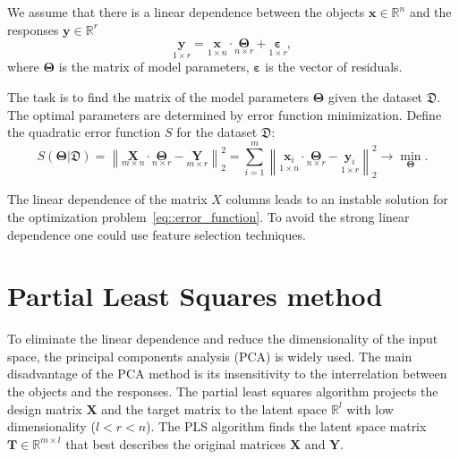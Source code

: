\documentclass[12pt,twoside]{article}
\begin{document}
We assume that there is a linear dependence between the objects $\mathbf{x} \in \mathbb{R}^n$ and the responses $\mathbf{y} \in \mathbb{R}^r$
\begin{equation}
 \underset{1 \times r}{\mathbf{y}} = \underset{1 \times n}{\mathbf{x}} \cdot \underset{n \times r}{\boldsymbol{\Theta}} + \underset{1 \times r}{\boldsymbol{\varepsilon}}, 
\label{eq::model}
\end{equation}
where $\boldsymbol{\Theta}$ is the matrix of model parameters, $\boldsymbol{\varepsilon}$ is the vector of residuals.

The task is to find the matrix of the model parameters $\boldsymbol{\Theta}$ given the dataset $\mathfrak{D}$.
The optimal parameters are determined by error function minimization. 
Define the quadratic error function $S$ for the dataset $\mathfrak{D}$:
\begin{equation}
	S(\boldsymbol{\Theta} | \mathfrak{D}) = {\left\| \underset{m \times n}{\mathbf{X}} \cdot \underset{n \times r}{\boldsymbol{\Theta}} - \underset{m \times r}{\mathbf{Y}} \right\| }_2^2 = \sum_{i=1}^m \left\| \underset{1 \times n}{\mathbf{x}_i} \cdot \underset{n \times r}{\boldsymbol{\Theta}} - \underset{1 \times r}{\mathbf{y}_i} \right\|_2^2 \rightarrow\min_{\boldsymbol{\Theta}}.
\label{eq::error_function}
\end{equation}
 
 The linear dependence of the matrix $X$ columns leads to an instable solution for the optimization problem~\eqref{eq::error_function}. 
 To avoid the strong linear dependence one could use feature selection techniques.

\section{Partial Least Squares method}

To eliminate the linear dependence and reduce the dimensionality of the input space, the principal components analysis (PCA) is widely used. 
The main disadvantage of the PCA method is its insensitivity to the interrelation between the objects and the responses.
The partial least squares algorithm projects the design matrix $\mathbf{X}$ and the target matrix to the latent space $\mathbb{R}^l$ with low dimensionality ($l < r < n$).
The PLS algorithm finds the latent space matrix $\mathbf{T} \in \mathbb{R}^{m \times l}$ that best describes the original matrices $\mathbf{X}$ and $\mathbf{Y}$.
\end{document}
